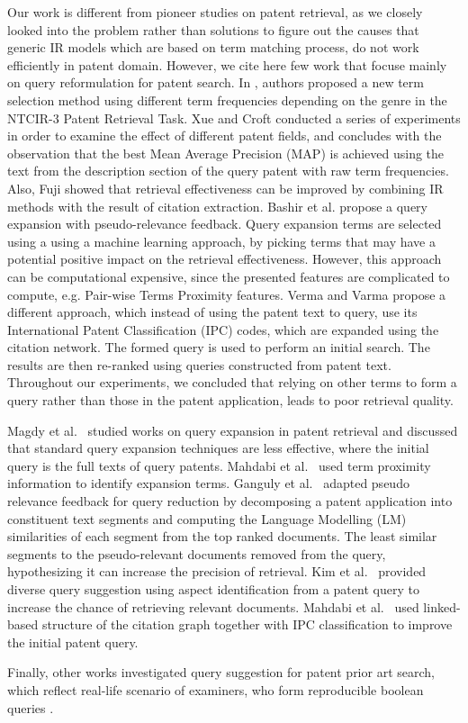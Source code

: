 

Our work is different from pioneer studies on patent retrieval, as we
closely looked into the problem rather than solutions to figure out
the causes that generic IR models which are based on term matching
process, do not work efficiently in patent domain. However, we cite here few work that focuse mainly on query reformulation for patent search. 
In \cite{Itoh2003}, authors proposed a new term selection method using different term
frequencies depending on the genre in the NTCIR-3 Patent Retrieval Task.
Xue and Croft \cite{xue2009transforming} conducted a series of experiments
in order to examine the effect of different patent fields, and concludes
with the observation that the best Mean Average Precision (MAP) is
achieved using the text from the description section of the query
patent with raw term frequencies. Also, Fuji \cite{Fujii2007}
showed that retrieval effectiveness can be improved by combining IR
methods with the result of citation extraction.
Bashir et al. \cite{Bashir2010} propose a query expansion with pseudo-relevance
feedback. Query expansion terms are selected using a using a machine
learning approach, by picking terms that may have a potential positive
impact on the retrieval effectiveness. However, this approach can
be computational expensive, since the presented features are complicated
to compute, e.g. Pair-wise Terms Proximity features. Verma and Varma
\cite{Verma2011} propose a different approach, which instead of using
the patent text to query, use its International Patent Classification
(IPC) codes, which are expanded using the citation network. The formed
query is used to perform an initial search. The results are then re-ranked
using queries constructed from patent text. Throughout our experiments,
we concluded that relying on other terms to form a query rather than
those in the patent application, leads to poor retrieval quality.

Magdy et
al.~\cite{magdy2011study} studied works on query expansion in patent
retrieval and discussed that standard query expansion techniques are
less effective, where the initial query is the full texts of query
patents. Mahdabi et al.~\cite{Mahdabi2013} used term proximity
information to identify expansion terms. Ganguly et
al.~\cite{ganguly2011patent} adapted pseudo relevance feedback for
query reduction by decomposing a patent application into constituent
text segments and computing the Language Modelling (LM) similarities
of each segment from the top ranked documents. The least similar
segments to the pseudo-relevant documents removed from the query,
hypothesizing it can increase the precision of retrieval. Kim et
al.~\cite{kim2014diversifying} provided diverse query suggestion using
aspect identification from a patent query to increase the chance of
retrieving relevant documents. Mahdabi et al.~\cite{mahdabi2014patent}
used linked-based structure of the citation graph together with IPC
classification to improve the initial patent query.


Finally, other works investigated query suggestion for patent prior
art search, which reflect real-life scenario of examiners, who form
reproducible boolean queries \cite{Adams2011,Azzopardi2010,Kim2011}.

